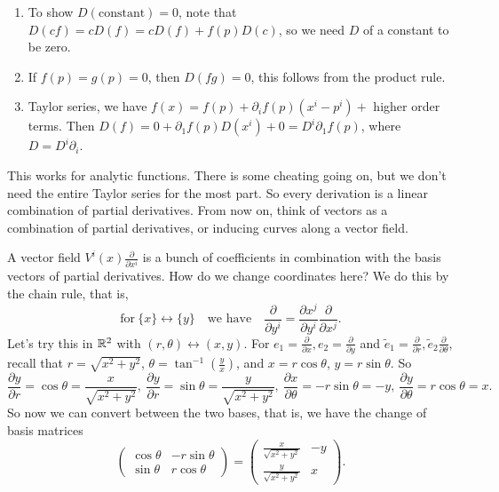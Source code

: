 \begin{enumerate}
    \item To show $D( \text{constant} )=0$, note that $D(cf)=cD(f)=cD(f)+f(p)D(c)$, so we need $D$ of a constant to be zero.
    \item If $f(p)=g(p)=0$, then $D(fg)=0$, this follows from the product rule.
    \item Taylor series, we have $f(x)=f(p)+ \partial _i f(p)(x^i -p^i )+$ higher order terms. Then $D(f)=0+\partial_1f(p)D(x^i )+0 =D^i  \partial_1f(p) $, where $D=D^i  \partial _i $. 
\end{enumerate}
This works for analytic functions. There is some cheating going on, but we don't need the entire Taylor series for the most part. So every derivation is a linear combination of partial derivatives. From now on, think of vectors as a combination of partial derivatives, or inducing curves along a vector field.

A vector field $V^i (x) \frac{\partial }{\partial x^i }$ is a bunch of coefficients in combination with the basis vectors of partial derivatives. How do we change coordinates here? We do this by the chain rule, that is, \[
\text{for} \ \{x\} \longleftrightarrow \{y\} \quad \text{we have} \quad \frac{\partial }{\partial y^i }= \frac{\partial x^j }{\partial y^i }\frac{\partial }{\partial x^j }.
\] 
Let's try this in $\mathbb{R}^2$ with $(r, \theta) \leftrightarrow (x,y)$. For $e_1= \frac{\partial}{\partial x}, e_2=\frac{\partial}{\partial y} $ and $\widetilde e_1= \frac{\partial }{\partial r}, \widetilde e_2 \frac{\partial }{\partial \theta}$, recall that $r = \sqrt{x^2+y^2} $, $\theta=\tan ^{-1} \left(\frac{y}{x}\right)$, and $x=r \cos \theta$, $y=r \sin \theta$. So \[
\frac{\partial y}{\partial r}= \cos \theta=\frac{x}{\sqrt{x^2+y^2} }, \ \frac{\partial y}{\partial r}= \sin \theta=\frac{y}{\sqrt{x^2+y^2} }, \ \frac{\partial x}{\partial \theta}= - r \sin \theta=-y, \ \frac{\partial y}{\partial \theta}=r \cos \theta=x.
\] So now we can convert between the two bases, that is, we have the change of basis matrices 
\[
\begin{pmatrix}
    \cos \theta & -r \sin \theta \\ \sin \theta & r \cos \theta
\end{pmatrix}= 
\begin{pmatrix}
    \frac{x}{\sqrt{x^2+y^2} } & -y \\
    \frac{y}{\sqrt{x^2+y^2} } & x
\end{pmatrix}.
\] 
